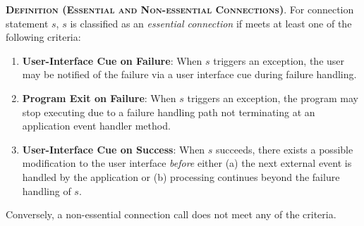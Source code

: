 \begin{description}[leftmargin=0cm,listparindent=0pt,itemindent=0cm]
\item \textsc{\bfseries{Definition (Essential and Non-essential
    Connections)}}.  For connection statement $s$, $s$ is classified as
  an {\it essential connection} if meets at least one of the following
  criteria:
  
\begin{enumerate}[leftmargin=0.5cm]

\item{\bf User-Interface Cue on Failure}: When $s$ triggers an exception,
  the user may be notified of the failure via a user interface cue
  during failure handling.

\item {\bf Program Exit on Failure}: When $s$ triggers an exception, the
  program may stop executing due to a failure handling path not
  terminating at an application event handler method.

\item {\bf User-Interface Cue on Success}: When $s$ succeeds, there
  exists a possible modification to the user interface {\it before}
  either (a) the next external event is handled by the application or
  (b) processing continues beyond the failure handling of $s$.

\end{enumerate}

\noindent Conversely, a non-essential connection call does not meet
any of the criteria.  

\end{description}




